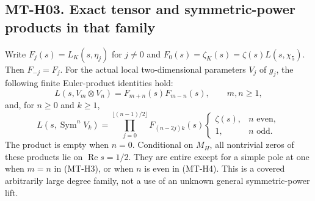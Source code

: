 \subsection*{MT-H03. Exact tensor and symmetric-power products in that family}
Write $F_j(s)=L_K(s,\eta_j)$ for $j\ne0$ and
$F_0(s)=\zeta_K(s)=\zeta(s)L(s,\chi_5)$. Then $F_{-j}=F_j$.
For the actual local two-dimensional parameters $V_j$ of $g_j$, the
following finite Euler-product identities hold:
\[
 L(s,V_m\otimes V_n)=F_{m+n}(s)F_{m-n}(s),\qquad m,n\ge1,
                                                               \tag{MT-H3}
\]
and, for $n\ge0$ and $k\ge1$,
\[
 L(s,\operatorname{Sym}^n V_k)=
 \prod_{j=0}^{\lfloor(n-1)/2\rfloor}F_{(n-2j)k}(s)
 \begin{cases}\zeta(s),&n\text{ even},\\1,&n\text{ odd}.
 \end{cases}                                                   \tag{MT-H4}
\]
The product is empty when $n=0$. Conditional on $M_H$, all nontrivial
zeros of these products lie on $\operatorname{Re}s=1/2$. They are
entire except for a simple pole at one when $m=n$ in (MT-H3), or
when $n$ is even in (MT-H4). This is a covered arbitrarily large
degree family, not a use of an unknown general symmetric-power lift.

